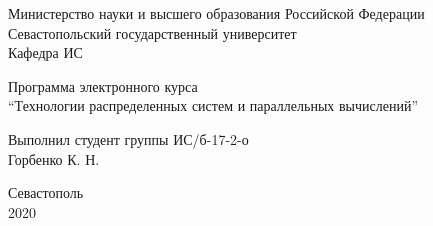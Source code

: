 \begin{titlepage}
    \thispagestyle{empty}
    
    \begin{center}
        
        Министерство науки и высшего образования Российской Федерации \\
        Севастопольский государственный университет \\
        Кафедра ИС
        
        \vfill

        Программа электронного курса \\
        \enquote{Технологии распределенных систем и параллельных вычислений} \\

    \end{center}

    \vspace{1cm}

    \noindent\hspace{7.5cm} Выполнил студент группы ИС/б-17-2-о \\
    \null\hspace{7.5cm} Горбенко К. Н. \\

    \vfill

    \begin{center}
        Севастополь \\
        2020
    \end{center}

\end{titlepage}